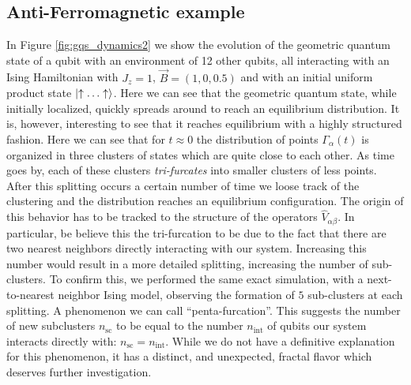 \documentclass[draft,nofootinbib,pre,twocolumn,showpacs,showkeys,preprintnumbers,floatfix]{revtex4-1}
\newcommand{\1}{\mathbbm{1}}
\begin{document}
\subsection*{Anti-Ferromagnetic example}
In Figure \ref{fig:gqs_dynamics2} 
we show the evolution of the geometric quantum state of a qubit with an environment of 12 other
qubits, all interacting with an Ising Hamiltonian with $J_z=1$, $\vec{B}=(1,0,0.5)$ and 
with an initial uniform product state $\ket{\uparrow \ldots \uparrow}$. Here we can see that
the geometric quantum state, while initially localized, quickly spreads around to reach an 
equilibrium distribution. It is, however, interesting to see that it reaches equilibrium with 
a highly structured fashion. Here we can see that for $t\approx 0$ the distribution of points 
$\Gamma_\alpha(t)$ is organized in three clusters of states which are quite close to each other. 
As time goes by, each of these clusters \emph{tri-furcates} into smaller clusters of less points. 
After this splitting occurs a certain number of time we loose track of the clustering and the distribution reaches
an equilibrium configuration. The origin of this behavior has to be tracked to the structure of the
operators $\hat{V}_{\alpha \beta}$. In particular, be believe this the tri-furcation to be due to the fact 
that there are two nearest neighbors directly interacting with our system. Increasing this number 
would result in a more detailed splitting, increasing the number of sub-clusters. To confirm this, 
we performed the same exact simulation, with a next-to-nearest neighbor Ising model, observing 
the formation of $5$ sub-clusters at each splitting. A phenomenon we can call ``penta-furcation''. 
This suggests the number of new subclusters $n_{\mathrm{sc}}$ to be equal to the number 
$n_{\mathrm{int}}$ of qubits our system interacts directly with: $n_{\mathrm{sc}} = n_{\mathrm{int}}$.
While we do not have a definitive explanation for this phenomenon, it has a distinct, and 
unexpected, fractal flavor which deserves further investigation.
\end{document}
